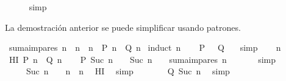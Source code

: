 \begin{isabellebody}
\ \ \ \ \isamarkupfalse%
\ simp\isanewline
{}\isamarkupfalse%
%
\endisatagproof
{\isafoldproof}%
%
\isadelimproof
%
\endisadelimproof
%
\begin{isamarkuptext}%
La demostración anterior se puede simplificar usando patrones.%
\end{isamarkuptext}\isamarkuptrue%
\isamarkupfalse%
\ {\isachardoublequoteopen}suma{\isacharunderscore}impares\ n\ {\isacharequal}\ n\ {\isacharasterisk}\ n{\isachardoublequoteclose}\ {\isacharparenleft}\ {\isachardoublequoteopen}{\isacharquery}P\ n\ {\isacharequal}\ {\isacharquery}Q\ n{\isachardoublequoteclose}{\isacharparenright}\isanewline
%
\isadelimproof
%
\endisadelimproof
%
\isatagproof
{}\isamarkupfalse%
\ {\isacharparenleft}induct\ n{\isacharparenright}\isanewline
\ \ \isamarkupfalse%
\ {\isachardoublequoteopen}{\isacharquery}P\ {}\ {\isacharequal}\ {\isacharquery}Q\ {}{\isachardoublequoteclose}\ \isamarkupfalse%
\ simp\isanewline
{}\isamarkupfalse%
\isanewline
\ \ \isamarkupfalse%
\ n\ \isanewline
\ \ \isamarkupfalse%
\ HI{\isacharcolon}\ {\isachardoublequoteopen}{\isacharquery}P\ n\ {\isacharequal}\ {\isacharquery}Q\ n{\isachardoublequoteclose}\isanewline
\ \ \isamarkupfalse%
\ {\isachardoublequoteopen}{\isacharquery}P\ {\isacharparenleft}Suc\ n{\isacharparenright}\ {\isacharequal}\ {\isacharparenleft}{}\ {\isacharasterisk}\ {\isacharparenleft}Suc\ n{\isacharparenright}\ {\isacharminus}\ {}{\isacharparenright}\ {\isacharplus}\ suma{\isacharunderscore}impares\ n{\isachardoublequoteclose}\ \isanewline
\ \ \ \ \isamarkupfalse%
\ simp\isanewline
\ \ \isamarkupfalse%
\ \isamarkupfalse%
\ {\isachardoublequoteopen}{\isasymdots}\ {\isacharequal}\ {\isacharparenleft}{}\ {\isacharasterisk}\ {\isacharparenleft}Suc\ n{\isacharparenright}\ {\isacharminus}\ {}{\isacharparenright}\ {\isacharplus}\ n\ {\isacharasterisk}\ n{\isachardoublequoteclose}\ \isamarkupfalse%
\ HI\ \isamarkupfalse%
\ simp\isanewline
\ \ \isamarkupfalse%
\ \isamarkupfalse%
\ {\isachardoublequoteopen}{\isasymdots}\ {\isacharequal}\ {\isacharquery}Q\ {\isacharparenleft}Suc\ n{\isacharparenright}{\isachardoublequoteclose}\ \isamarkupfalse%
\ simp\isanewline
\ \ \isamarkupfalse%
\ \isamarkupfalse%

\end{isabellebody}

